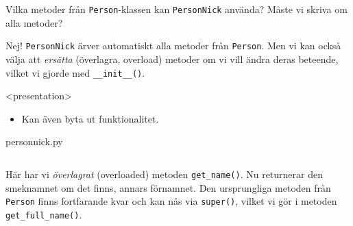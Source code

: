 
\begin{exercise}
  Vilka metoder från \texttt{Person}-klassen kan
  \texttt{PersonNick} använda? Måste vi skriva om alla metoder?
\end{exercise}

Nej! \texttt{PersonNick} ärver automatiskt alla metoder från 
\texttt{Person}. Men vi kan också välja att \emph{ersätta} 
(överlagra, \foreignlanguage{english}{overload}) metoder om vi vill ändra deras 
beteende, vilket vi gjorde med \texttt{__init__()}.

\begin{frame}[fragile]
  \begin{onlyenv}<presentation>
  \begin{remark}
    \begin{itemize}
      \item Kan även byta ut funktionalitet.
    \end{itemize}
  \end{remark}
  \end{onlyenv}
  person\textunderscore nick.py \hrulefill
  \inputminted[linenos,firstline=21,lastline=29]{python}{examples/person_nick.py}
\end{frame}

Här har vi \emph{överlagrat} (\foreignlanguage{english}{overloaded}) metoden 
\texttt{get_name()}. Nu returnerar den smeknamnet om det finns, 
annars förnamnet. Den ursprungliga metoden från \texttt{Person} 
finns fortfarande kvar och kan nås via \texttt{super()}, vilket 
vi gör i metoden \texttt{get_full_name()}.

